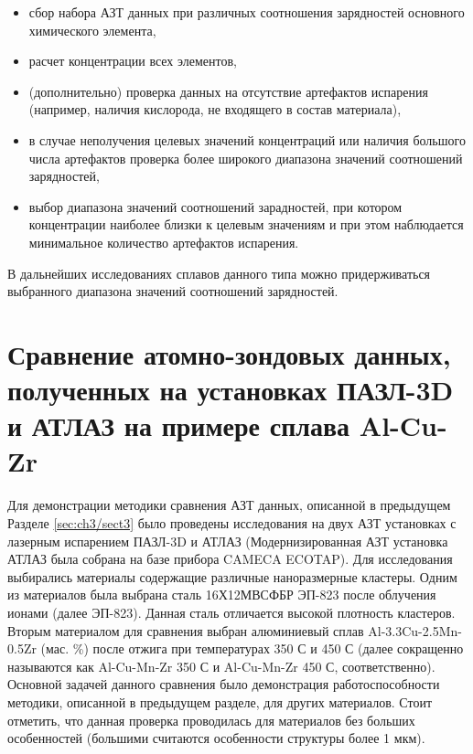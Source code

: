 \begin{itemize}
	\item сбор набора АЗТ данных при различных соотношения зарядностей основного химического элемента,
	\item расчет концентрации всех элементов,	
	\item (дополнительно) проверка данных на отсутствие артефактов испарения (например, наличия кислорода, не входящего в состав материала),
	\item в случае неполучения целевых значений концентраций или наличия большого числа артефактов проверка более широкого диапазона значений соотношений зарядностей,
	\item выбор диапазона значений соотношений зарадностей, при котором концентрации наиболее близки к целевым значениям и при этом наблюдается минимальное количество артефактов испарения.	
\end{itemize}

В дальнейших исследованиях сплавов данного типа можно придерживаться выбранного диапазона значений соотношений зарядностей.

\FloatBarrier

\section{Сравнение атомно-зондовых данных, полученных на установках ПАЗЛ-3D и АТЛАЗ на примере сплава Al-Cu-Zr}\label{sec:ch3/sect4}

Для демонстрации методики сравнения АЗТ данных, описанной в предыдущем Разделе \cref{sec:ch3/sect3} было проведены исследования на двух АЗТ установках с лазерным испарением ПАЗЛ-3D и АТЛАЗ (Модернизированная АЗТ установка АТЛАЗ была собрана на базе прибора CAMECA ECOTAP). Для исследования выбирались материалы содержащие различные наноразмерные кластеры. Одним из материалов была выбрана сталь 16Х12МВСФБР ЭП-823 \cite{Porollo04} после облучения ионами (далее ЭП-823). Данная сталь отличается высокой плотность кластеров. Вторым материалом для сравнения выбран алюминиевый сплав Al-3.3Cu-2.5Mn-0.5Zr (мас. \%) после отжига при температурах 350 \textdegree С и 450 \textdegree С \cite{Belov22,Belov21} (далее сокращенно называются как Al-Cu-Mn-Zr 350 \textdegree С и Al-Cu-Mn-Zr 450 \textdegree С, соответственно). Основной задачей данного сравнения было демонстрация работоспособности методики, описанной в предыдущем разделе, для других материалов. Стоит отметить, что данная проверка проводилась для материалов без больших особенностей (большими считаются особенности структуры более 1 мкм). 

